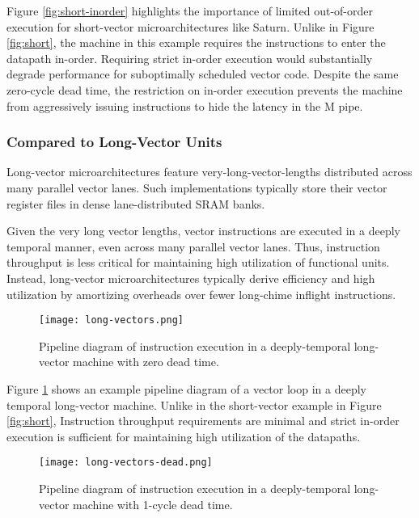 Figure \ref{fig:short-inorder} highlights the importance of limited out-of-order execution for short-vector microarchitectures like Saturn.
Unlike in Figure \ref{fig:short}, the machine in this example requires the instructions to enter the datapath in-order.
Requiring strict in-order execution would substantially degrade performance for suboptimally scheduled vector code.
Despite the same zero-cycle dead time, the restriction on in-order execution prevents the machine from aggressively issuing instructions to hide the latency in the M pipe.

\subsubsection{Compared to Long-Vector Units}

Long-vector microarchitectures feature very-long-vector-lengths distributed across many parallel vector lanes.
Such implementations typically store their vector register files in dense lane-distributed SRAM banks.

Given the very long vector lengths, vector instructions are executed in a deeply temporal manner, even across many parallel vector lanes.
Thus, instruction throughput is less critical for maintaining high utilization of functional units.
Instead, long-vector microarchitectures typically derive efficiency and high utilization by amortizing overheads over fewer long-chime inflight instructions.

\begin{figure}[h]
  \centering
  \texttt{[image: long-vectors.png]}
  \caption{Pipeline diagram of instruction execution in a deeply-temporal long-vector machine with zero dead time.}
  \label{fig:long}
\end{figure}

Figure \ref{fig:long} shows an example pipeline diagram of a vector loop in a deeply temporal long-vector machine.
Unlike in the short-vector example in Figure \ref{fig:short}, Instruction throughput requirements are minimal and strict in-order execution is sufficient for maintaining high utilization of the datapaths.

\begin{figure}[h]
  \centering
  \texttt{[image: long-vectors-dead.png]}
  \caption{Pipeline diagram of instruction execution in a deeply-temporal long-vector machine with 1-cycle dead time.}
  \label{fig:long-dead}
\end{figure}

